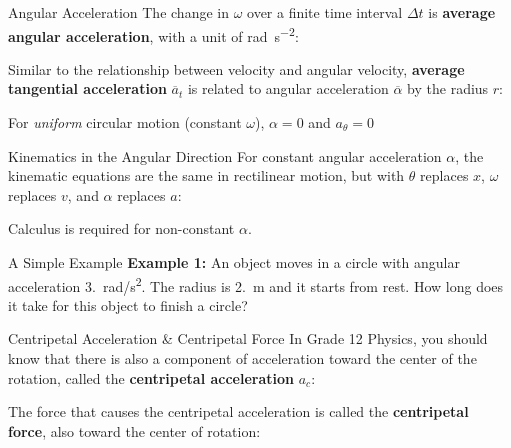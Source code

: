\documentclass[12pt,compress,aspectratio=169]{beamer}
\newcommand{\mb}[1]{\ensuremath\mathbf{#1}}
\newcommand{\eq}[2]{\vspace{#1}{\Large\begin{displaymath}#2\end{displaymath}}}
\begin{document}
\begin{frame}{Angular Acceleration}
  The change in $\omega$ over a finite time interval $\Delta t$ is
  \textbf{average angular acceleration}, with a unit of
  \si{rad\per\second\squared}:

  \eq{-.25in}{
    \boxed{\overline{\alpha}=\frac{\Delta\omega}{\Delta t}}
  }

  Similar to the relationship between velocity and angular velocity,
  \textbf{average tangential acceleration} $\overline{a}_t$ is related to
  angular acceleration $\overline{\alpha}$ by the radius $r$:
    
  \eq{-.2in}{
    \boxed{\overline{a}_t
      =\frac{\Delta v}{\Delta t}
      =\frac{r\Delta\omega}{\Delta t}
      =r\overline{\alpha}
    }
  }
    
  For \emph{uniform} circular motion (constant $\omega$), $\alpha=0$ and
  $a_\theta=0$
\end{frame}



\begin{frame}{Kinematics in the Angular Direction}
  For constant angular acceleration $\alpha$, the kinematic equations are the
  same in rectilinear motion, but with $\theta$ replaces $x$, $\omega$
  replaces $v$, and $\alpha$ replaces $a$:

  
  Calculus is required for non-constant $\alpha$.
\end{frame}



\begin{frame}{A Simple Example}
  \textbf{Example 1:} An object moves in a circle with angular acceleration
  \SI{3.}{rad/\s^2}. The radius is \SI{2.}{\metre} and it starts from rest. How
  long does it take for this object to finish a circle?
\end{frame}



\begin{frame}{Centripetal Acceleration \& Centripetal Force}
  In Grade 12 Physics, you should know that there is also a component of
  acceleration toward the center of the rotation, called the
  \textbf{centripetal acceleration} $a_c$:

  \eq{-.15in}{
    \boxed{a_c=\frac{v^2}{r}=\omega^2r}
  }

  The force that causes the centripetal acceleration is called the
  \textbf{centripetal force}, also toward the center of rotation:

  \eq{-.15in}{
    \boxed{\mb{F}_c=ma_c=\frac{mv^2}{r}}
  }
\end{frame}
\end{document}
